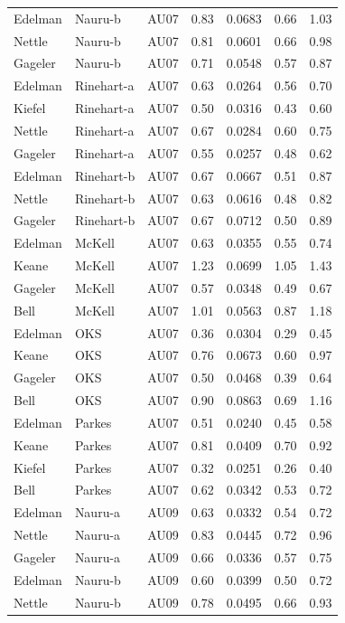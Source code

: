 \documentclass{monashthesis}
\begin{document}
\begin{center}
\begin{longtable}{lllllll}
Edelman & Nauru-b & AU07 & 0.83 & 0.0683 & 0.66 & 1.03 \\
Nettle & Nauru-b & AU07 & 0.81 & 0.0601 & 0.66 & 0.98 \\
Gageler & Nauru-b & AU07 & 0.71 & 0.0548 & 0.57 & 0.87 \\
Edelman & Rinehart-a & AU07 & 0.63 & 0.0264 & 0.56 & 0.70 \\
Kiefel & Rinehart-a & AU07 & 0.50 & 0.0316 & 0.43 & 0.60 \\
Nettle & Rinehart-a & AU07 & 0.67 & 0.0284 & 0.60 & 0.75 \\
Gageler & Rinehart-a & AU07 & 0.55 & 0.0257 & 0.48 & 0.62 \\
Edelman & Rinehart-b & AU07 & 0.67 & 0.0667 & 0.51 & 0.87 \\
Nettle & Rinehart-b & AU07 & 0.63 & 0.0616 & 0.48 & 0.82 \\
Gageler & Rinehart-b & AU07 & 0.67 & 0.0712 & 0.50 & 0.89 \\
Edelman & McKell & AU07 & 0.63 & 0.0355 & 0.55 & 0.74 \\
Keane & McKell & AU07 & 1.23 & 0.0699 & 1.05 & 1.43 \\
Gageler & McKell & AU07 & 0.57 & 0.0348 & 0.49 & 0.67 \\
Bell & McKell & AU07 & 1.01 & 0.0563 & 0.87 & 1.18 \\
Edelman & OKS & AU07 & 0.36 & 0.0304 & 0.29 & 0.45 \\
Keane & OKS & AU07 & 0.76 & 0.0673 & 0.60 & 0.97 \\
Gageler & OKS & AU07 & 0.50 & 0.0468 & 0.39 & 0.64 \\
Bell & OKS & AU07 & 0.90 & 0.0863 & 0.69 & 1.16 \\
Edelman & Parkes & AU07 & 0.51 & 0.0240 & 0.45 & 0.58 \\
Keane & Parkes & AU07 & 0.81 & 0.0409 & 0.70 & 0.92 \\
Kiefel & Parkes & AU07 & 0.32 & 0.0251 & 0.26 & 0.40 \\
Bell & Parkes & AU07 & 0.62 & 0.0342 & 0.53 & 0.72 \\
Edelman & Nauru-a & AU09 & 0.63 & 0.0332 & 0.54 & 0.72 \\
Nettle & Nauru-a & AU09 & 0.83 & 0.0445 & 0.72 & 0.96 \\
Gageler & Nauru-a & AU09 & 0.66 & 0.0336 & 0.57 & 0.75 \\
Edelman & Nauru-b & AU09 & 0.60 & 0.0399 & 0.50 & 0.72 \\
Nettle & Nauru-b & AU09 & 0.78 & 0.0495 & 0.66 & 0.93 \\

\end{longtable}
\end{center}
\end{document}
